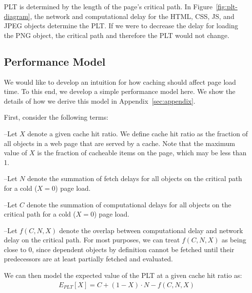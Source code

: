 PLT is determined by the length of the page's critical path. In
Figure~\ref{fig:plt-diagram}, the network and computational delay for the HTML, CSS, JS, and JPEG
objects determine the PLT. If we were to decrease the delay for loading the
PNG object, the critical path and therefore the PLT would not change.


\subsection{Performance Model}
\label{subsec:model}

We would like to develop an intuition for how caching should affect page load
time. To this end, we
develop a simple performance model here. We show the details of how we derive
this model in Appendix~\ref{sec:appendix}.

First, consider the following terms:

\noindent--Let $X$ denote a given cache hit ratio. We define cache hit ratio as the fraction
of all objects in a web page that are served by a cache. Note that the maximum
value of $X$ is the fraction of cacheable items on the page, which may be less
than 1.

\noindent--Let $N$ denote the summation of fetch delays for all objects on the
critical path for a cold ($X=0$) page load.

\noindent--Let $C$ denote the summation of computational delays for all
objects on the critical path for a cold ($X=0$) page load.

\noindent--Let $f(C,N,X)$ denote the overlap between computational delay and
network delay on the critical path. For most purposes, we can treat $f(C,N,X)$
as being close to 0, since dependent objects by definition cannot be fetched
until their predecessors are at least partially fetched and evaluated.

We can then model the expected value of the PLT at a given cache hit ratio as:
\begin{align*}
E_{PLT}[X] = C + (1 - X) \cdot N - f(C,N,X)
\end{align*}

